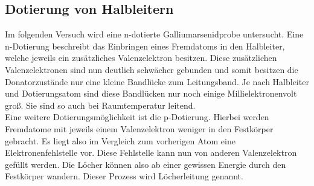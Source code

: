 \subsection{Dotierung von Halbleitern}
Im folgenden Versuch wird eine n-dotierte 
Galliumarsenidprobe untersucht. Eine n-Dotierung beschreibt das Einbringen eines Fremdatoms in den Halbleiter, welche jeweils ein zusätzliches Valenzelektron besitzen. Diese
zusätzlichen Valenzelektronen sind nun deutlich schwächer gebunden und somit besitzen die Donatorzustände nur eine kleine Bandlücke zum Leitungsband. Je nach Halbleiter und Dotierungsatom sind
diese Bandlücken nur noch einige Millielektronenvolt groß. Sie sind so auch bei Raumtemperatur leitend.
\\
Eine weitere Dotierungsmöglichkeit ist die p-Dotierung. Hierbei werden Fremdatome mit jeweils einem Valenzelektron weniger in den Festkörper gebracht. Es liegt also im Vergleich zum vorherigen Atom eine Elektronenfehlstelle vor. 
Diese Fehlstelle kann nun von anderen Valenzelektron gefüllt werden. Die Löcher können also ab einer gewissen Energie durch den Festkörper wandern. Dieser Prozess wird Löcherleitung genannt.







